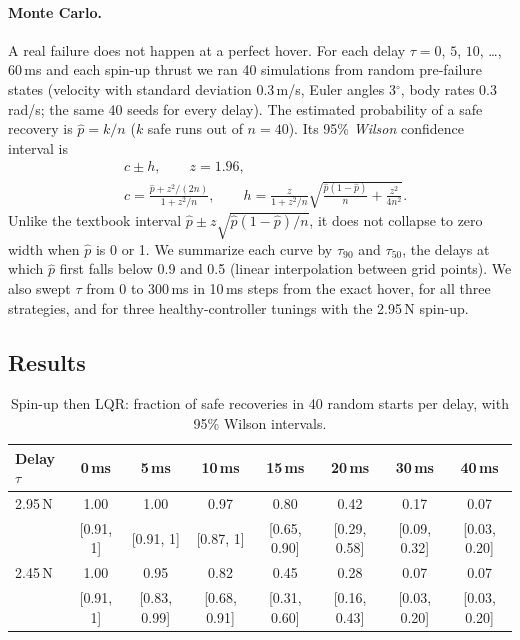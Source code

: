 \paragraph{Monte Carlo.} A real failure does not happen at a perfect hover. For each delay $\tau = 0$, $5$, $10$, \dots, $60$\,ms and each spin-up thrust we ran 40 simulations from random pre-failure states (velocity with standard deviation 0.3\,m/s, Euler angles 3$^\circ$, body rates 0.3\,rad/s; the same 40 seeds for every delay). The estimated probability of a safe recovery is $\hat p = k/n$ ($k$ safe runs out of $n=40$). Its 95\% \emph{Wilson} confidence interval is
\begin{equation}
  \begin{aligned}
  &c \pm h, \qquad z = 1.96, \\
  &c = \frac{\hat p + z^2/(2n)}{1+z^2/n}, \qquad h = \frac{z}{1+z^2/n}\sqrt{\frac{\hat p(1-\hat p)}{n} + \frac{z^2}{4n^2}} .
  \end{aligned}
\end{equation}
Unlike the textbook interval $\hat p \pm z\sqrt{\hat p(1-\hat p)/n}$, it does not collapse to zero width when $\hat p$ is 0 or 1. We summarize each curve by $\tau_{90}$ and $\tau_{50}$, the delays at which $\hat p$ first falls below 0.9 and 0.5 (linear interpolation between grid points). We also swept $\tau$ from 0 to 300\,ms in 10\,ms steps from the exact hover, for all three strategies, and for three healthy-controller tunings with the 2.95\,N spin-up.

\subsection{Results}
\begin{table}[h]
\centering\footnotesize
\caption{Spin-up then LQR: fraction of safe recoveries in 40 random starts per delay, with 95\% Wilson intervals.}\label{tab:delay}
\setlength{\tabcolsep}{3pt}
\begin{tabular}{lccccccc}
\toprule
Delay $\tau$ & 0\,ms & 5\,ms & 10\,ms & 15\,ms & 20\,ms & 30\,ms & 40\,ms \\
\midrule
2.95\,N & 1.00 & 1.00 & 0.97 & 0.80 & 0.42 & 0.17 & 0.07 \\
 & [0.91, 1] & [0.91, 1] & [0.87, 1] & [0.65, 0.90] & [0.29, 0.58] & [0.09, 0.32] & [0.03, 0.20] \\
\midrule
2.45\,N & 1.00 & 0.95 & 0.82 & 0.45 & 0.28 & 0.07 & 0.07 \\
 & [0.91, 1] & [0.83, 0.99] & [0.68, 0.91] & [0.31, 0.60] & [0.16, 0.43] & [0.03, 0.20] & [0.03, 0.20] \\
\bottomrule
\end{tabular}
\end{table}


